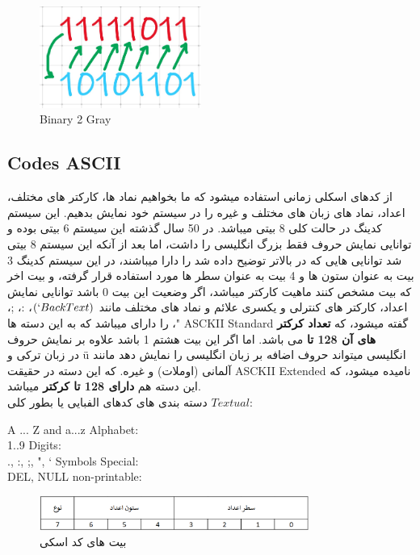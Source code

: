 \documentclass[pt, a5paper]{article}
\begin{document}
\begin{figure}[htbp]\centering
	\centerline{\includegraphics[width=150pt]{img/Gary2Binary.jpg}}
	\caption{Binary 2 Gray}
	\label{fig}
\end{figure}

\raggedleft
\justifying
\subsection{Codes ASCII}
از کدهای اسکلی زمانی استفاده میشود که ما بخواهیم نماد ها، کارکتر های مختلف، اعداد، نماد های زبان های مختلف و غیره را در سیستم خود نمایش بدهیم. این سیستم کدینگ در حالت کلی 8 بیتی میباشد. در 50 سال گذشته این سیستم 6 بیتی بوده و توانایی نمایش حروف فقط بزرگ انگلیسی را داشت، اما بعد از آنکه این سیستم 8 بیتی شد توانایی هایی که در بالاتر توضیح داده شد را دارا میباشند، در این سیستم کدینگ 3 بیت به عنوان ستون ها و 4 بیت به عنوان سطر ها مورد استفاده قرار گرفته، و بیت اخر که بیت مشخص کنند ماهیت کارکتر میباشد، اگر وضعیت این بیت 0 باشد توانایی نمایش اعداد، کارکتر های کنترلی و یکسری علائم و نماد های مختلف مانند
$(` Back Text)$،
:،
;،
"،
را دارای میباشد که به این دسته ها
ASCKII Standard
گفته میشود، که \textbf{تعداد کرکتر های آن 128 تا }می باشد. اما اگر این بیت هشتم 1 باشد علاوه بر نمایش حروف انگلیسی میتواند حروف اضافه بر زبان انگلیسی را نمایش دهد مانند $ü$ در زبان ترکی و آلمانی (اوملات) و غیره. که این دسته در حقیقت ASCKII Extended نامیده میشود، که این دسته هم \textbf{دارای 128 تا کرکتر} میباشد.\\
دسته بندی های کدهای الفبایی یا بطور کلی $Textual$:\\

\raggedright
A ... Z and a...z Alphabet:\\
1..9 Digits:\\
., :, ;, ", `  Symbols Special:\\
DEL, NULL non-printable:\\
\raggedleft
\justifying

\begin{figure}[htbp]
	\centerline{\includegraphics[width=250pt]{img/asciibits.png}}
	\caption{بیت های کد اسکی}
	\label{fig}
\end{figure}
\end{document}
